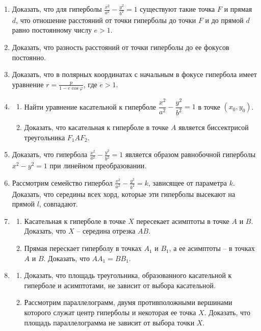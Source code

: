 \begin{enumerate}

	\item Доказать, что для гиперболы $\frac{x^2}{a^2} - \frac{y^2}{b^2} = 1$ существуют такие точка $F$ и прямая $d$, что отношение расстояний от точки гиперболы до точки $F$ и до прямой $d$ равно постоянному числу $e > 1$.

	\item Доказать, что разность расстояний от точки гиперболы до ее фокусов постоянно.

	\item Доказать, что в полярных координатах с начальным в фокусе гипербола имеет уравнение $r = \frac{p}{1 - e\cos\varphi}$, где $e > 1$.

	\item
	\begin{enumerate}
		\item Найти уравнение касательной к гиперболе $\dfrac{x^2}{a^2} - \dfrac{y^2}{b^2} = 1$ в точке $(x_0, y_0)$.
		\item Доказать, что касательная к гиперболе в точке $A$ является биссектрисой треугольника $F_1AF_2$.
	\end{enumerate}

	\item Доказать, что гипербола $\frac{x^2}{a^2} - \frac{y^2}{b^2} = 1$ является образом равнобочной гиперболы $x^2 - y^2 = 1$ при линейном преобразовании.

	\item Рассмотрим семейство гипербол $\frac{x^2}{a^2} - \frac{y^2}{b^2} = k$, зависящее от параметра $k$. Доказать, что середины всех хорд, которые эти гиперболы высекают на прямой $l$, совпадают.
	
	\item 
	\begin{enumerate}
		\item Касательная к гиперболе в точке $X$ пересекает асимптоты в точке $A$ и $B$. Доказать, что $X$ -- середина отрезка $AB$.
		\item Прямая перескает гиперболу в точках $A_1$ и $B_1$, а ее асимптоты -- в точках $A$ и $B$. Доказать, что $AA_1 = BB_1$.
	\end{enumerate}

	\item
	\begin{enumerate}
		\item Доказать, что площадь треугольника, образованного касательной к гиперболе и асимптотами, не зависит от выбора касательной.
		\item Рассмотрим параллелограмм, двумя противположными вершинами которого служат центр гиперболы и некоторая ее точка $X$. Доказать, что площадь параллелограмма не зависит от выбора точки $X$.
	\end{enumerate}


\end{enumerate}
